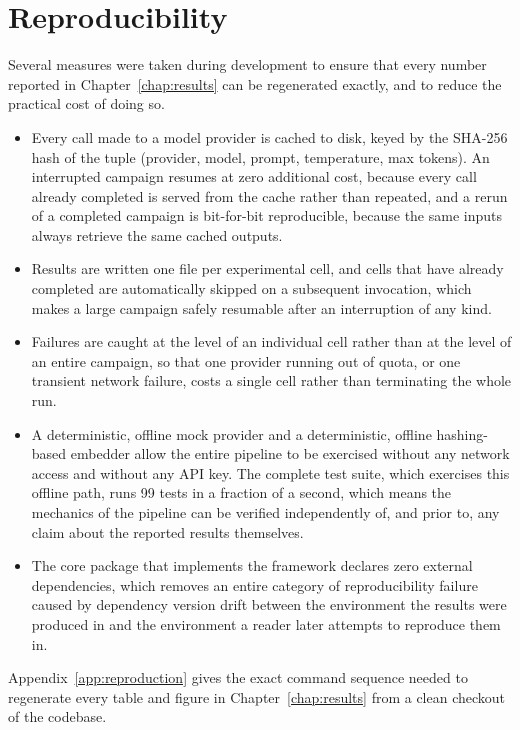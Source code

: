 \section{Reproducibility}
\label{sec:reproducibility}

Several measures were taken during development to ensure that every number reported in Chapter~\ref{chap:results} can be regenerated exactly, and to reduce the practical cost of doing so.

\begin{itemize}
\item Every call made to a model provider is cached to disk, keyed by the SHA-256 hash of the tuple (provider, model, prompt, temperature, max tokens). An interrupted campaign resumes at zero additional cost, because every call already completed is served from the cache rather than repeated, and a rerun of a completed campaign is bit-for-bit reproducible, because the same inputs always retrieve the same cached outputs.
\item Results are written one file per experimental cell, and cells that have already completed are automatically skipped on a subsequent invocation, which makes a large campaign safely resumable after an interruption of any kind.
\item Failures are caught at the level of an individual cell rather than at the level of an entire campaign, so that one provider running out of quota, or one transient network failure, costs a single cell rather than terminating the whole run.
\item A deterministic, offline mock provider and a deterministic, offline hashing-based embedder allow the entire pipeline to be exercised without any network access and without any API key. The complete test suite, which exercises this offline path, runs 99 tests in a fraction of a second, which means the mechanics of the pipeline can be verified independently of, and prior to, any claim about the reported results themselves.
\item The core package that implements the framework declares zero external dependencies, which removes an entire category of reproducibility failure caused by dependency version drift between the environment the results were produced in and the environment a reader later attempts to reproduce them in.
\end{itemize}

Appendix~\ref{app:reproduction} gives the exact command sequence needed to regenerate every table and figure in Chapter~\ref{chap:results} from a clean checkout of the codebase.
